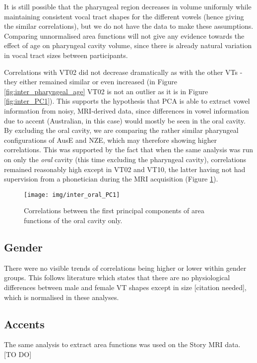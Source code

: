 It is still possible that the pharyngeal region decreases in volume uniformly while maintaining consistent vocal tract shapes for the different vowels (hence giving the similar correlations), but we do not have the data to make these assumptions. Comparing unnormalised area functions will not give any evidence towards the effect of age on pharyngeal cavity volume, since there is already natural variation in vocal tract sizes between participants.

Correlations with VT02 did not decrease dramatically as with the other VTs - they either remained similar or even increased (in Figure \ref{fig:inter_pharyngeal_age} VT02 is not an outlier as it is in Figure \ref{fig:inter_PC1}). This supports the hypothesis that PCA is able to extract vowel information from noisy, MRI-derived data, since differences in vowel information due to accent (Australian, in this case) would mostly be seen in the oral cavity. By excluding the oral cavity, we are comparing the rather similar pharyngeal configurations of AusE and NZE, which may therefore showing higher correlations. This was supported by the fact that when the same analysis was run on only the \textit{oral} cavity (this time excluding the pharyngeal cavity), correlations remained reasonably high except in VT02 and VT10, the latter having not had supervision from a phonetician during the MRI acquisition (Figure \ref{fig:inter_oral_PC1}).

\begin{figure}[H]
    \centering
    \texttt{[image: img/inter\_oral\_PC1]}
    \caption{Correlations between the first principal components of area functions of the oral cavity only.}
    \label{fig:inter_oral_PC1}
\end{figure}
    
\subsection{Gender}

There were no visible trends of correlations being higher or lower within gender groups. This follows literature which states that there are no physiological differences between male and female VT shapes except in size [citation needed], which is normalised in these analyses.

\subsection{Accents}

The same analysis to extract area functions was used on the Story MRI data. [TO DO]